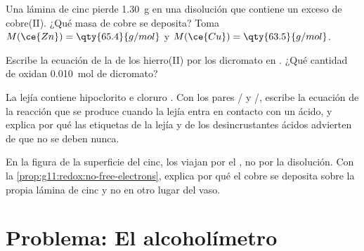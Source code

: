 \begin{exercise}[$\star\star\star$]\label{exo:g11:redox:12}
Una lámina de cinc pierde \qty{1.30}{g} en una disolución que contiene
un exceso de  cobre(II). ¿Qué masa de cobre se deposita? Toma
$M(\ce{Zn}) = \qty{65.4}{g/mol}$ y $M(\ce{Cu}) = \qty{63.5}{g/mol}$.
\end{exercise}

\begin{exercise}[$\star\star\star$]\label{exo:g11:redox:13}
Escribe la ecuación de la  de los  hierro(II) por los
 dicromato en . ¿Qué cantidad de 
oxidan \qty{0.010}{mol} de  dicromato?
\end{exercise}

\begin{exercise}[$\star\star\star$]\label{exo:g11:redox:14}
La lejía contiene  hipoclorito  e  cloruro .
Con los pares / y /, escribe la
ecuación de la reacción que se produce cuando la lejía entra en contacto
con un ácido, y explica por qué las etiquetas de la lejía y de los
desincrustantes ácidos advierten de que no se deben  nunca.
\end{exercise}

\begin{exercise}[$\star\star\star$]\label{exo:g11:redox:15}
En la figura de la superficie del cinc, los  viajan por el
, no por la disolución. Con la
\cref{prop:g11:redox:no-free-electrons}, explica por qué el cobre se
deposita sobre la propia lámina de cinc y no en otro lugar del vaso.
\end{exercise}

\section{Problema: El alcoholímetro}

